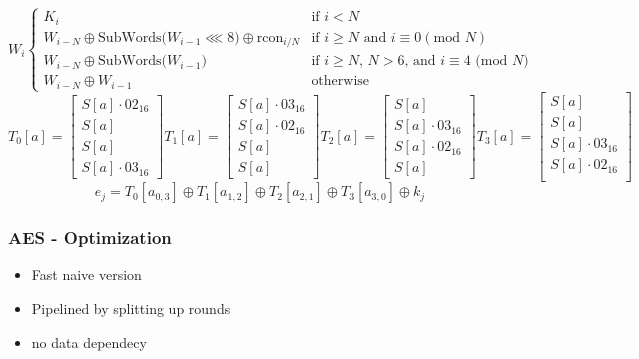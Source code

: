 \begin{frame}
  \begin{minipage}[b]{\linewidth}
    \fontsize{8pt}{6}
    \selectfont
    \begin{equation*}
      W_i
      \begin{cases}
        K_i & \text{if } i < N\\
        W_{i-N} \oplus \text{SubWords($W_{i-1}\lll 8$)} \oplus \text{rcon}_{i/N} & \text{if } i \geq N \text{ and }  i \equiv 0 (\text{mod } N)\\
      W_{i-N} \oplus \text{SubWords($W_{i-1}$)} & \text{if $i \geq N$, $N > 6$, and $i \equiv 4$ (mod $N$)}\\
      W_{i-N} \oplus W_{i-1} & \text{otherwise}
      \end{cases}
    \end{equation*}
    \fontsize{8pt}{6}
    \selectfont
    \begin{equation*}
      T_0[a] = \begin{bmatrix}
        S[a] \cdot 02_{16}\\
        S[a]\\
        S[a]\\
        S[a] \cdot 03_{16}
      \end{bmatrix}
      T_1[a] = \begin{bmatrix}
        S[a] \cdot 03_{16}\\
        S[a] \cdot 02_{16}\\
        S[a]\\
        S[a]
      \end{bmatrix}
      T_2[a] = \begin{bmatrix}
        S[a]\\
        S[a] \cdot 03_{16}\\
        S[a] \cdot 02_{16}\\
        S[a]
      \end{bmatrix}
      T_3[a] = \begin{bmatrix}
        S[a]\\
        S[a]\\
        S[a] \cdot 03_{16}\\
        S[a] \cdot 02_{16}\\
      \end{bmatrix}
    \end{equation*}
    \begin{equation*}
      e_j = T_0 [a_{0,3}] \oplus T_1 [a_{1,2}] \oplus T_2 [a_{2,1}] \oplus T_3 [a_{3,0}] \oplus k_j
    \end{equation*}

  \end{minipage}
\end{frame}

\begin{frame}
  \frametitle{AES - Optimization}
  \begin{itemize}
  \item Fast naive version
  \item Pipelined by splitting up rounds
  \item no data dependecy
  \end{itemize}
\end{frame}